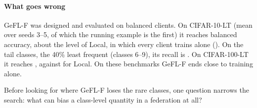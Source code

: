 \paragraph{What goes wrong} GeFL-F was designed and evaluated on balanced clients. On CIFAR-10-LT (mean over seeds 3--5, of which the running example is the first) it reaches  balanced accuracy, about the level of Local, in which
every client trains alone (). On the tail classes, the 40\% least frequent (classes 6--9),
its recall is . On CIFAR-100-LT it reaches , against
 for Local. On these benchmarks GeFL-F ends close to training alone.

Before looking for where GeFL-F loses the rare classes, one question narrows the search: what can bias a class-level
quantity in a federation at all?
